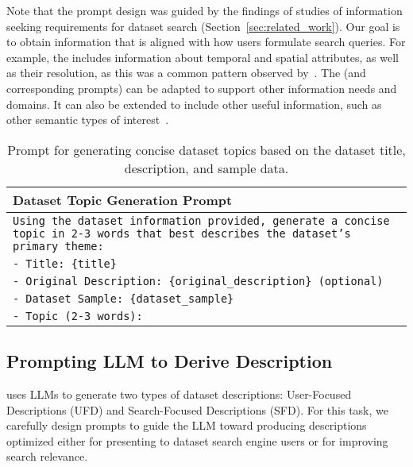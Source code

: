 Note that the prompt design was guided by the findings
of studies of information seeking requirements for dataset search (Section~\ref{sec:related_work}). Our goal is to obtain information that is aligned with how users formulate search queries. For example, the \semprof includes information about temporal and spatial attributes, as well as their resolution, as this was a common pattern observed by~\citet{koesten2017trials}.
%
The \semprof (and corresponding prompts) can be adapted to support other information needs and domains. It can also be extended to include other useful information, such as other semantic types of interest~\cite{archetype@vldb2024,chorus@vldb2024}.


\begin{table}
    \small
    \centering
    \begin{tabular}{p{8cm}}
    \toprule
    \textbf{Dataset Topic Generation Prompt} \\
    \midrule
    \texttt{Using the dataset information provided, generate a concise topic in 2-3 words that best describes the dataset's primary theme:} \\
    \texttt{- Title: \{title\}} \\
    \texttt{- Original Description: \{original\_description\} (optional)} \\
    \texttt{- Dataset Sample: \{dataset\_sample\}} \\
    \texttt{- Topic (2-3 words):} \\

    \bottomrule
    \end{tabular}
    \caption{Prompt for generating concise dataset topics based on the dataset title, description, and sample data.}
    \label{tab:dataset_topic_prompt}
    \vspace{-3.0em}
\end{table}




\subsection{Prompting LLM to Derive Description}
\label{sec:solution_UFD_SFD}



\SystemName uses LLMs to generate two types of dataset descriptions: User-Focused Descriptions (UFD) and Search-Focused Descriptions (SFD). For this task, we carefully design prompts to guide the LLM toward producing descriptions optimized either for presenting to dataset search engine users or for improving search relevance.

